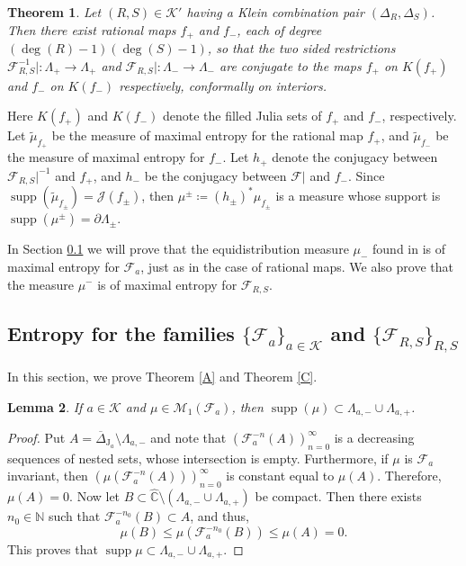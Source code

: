 \documentclass[11pt,letterpaper]{article}
\newtheorem{theorem}{Theorem}[section]
\newtheorem{lemma}[theorem]{Lemma}
\theoremstyle{definition}
\def\supp{\operatorname{supp}}
\def\F{\mathcal{F}_a}
\def\J{\operatorname{J}_a}
\begin{document}
\begin{theorem}\label{KleinRS}
Let $(R,S)\in\mathcal{K}'$ having a Klein combination pair $(\Delta_R,\Delta_S)$. Then there exist rational maps $f_+$ and $f_-$, each of degree $(\deg(R)-1)(\deg(S)-1)$, so that the two sided restrictions $\mathcal{F}_{R,S}^{-1}|:\Lambda_+\to\Lambda_+$ and $\mathcal{F}_{R,S}|:\Lambda_-\to\Lambda_-$ are conjugate to the maps $f_+$  on $K(f_+)$ and $f_-$ on $K(f_-)$ respectively, conformally on interiors.
\end{theorem}
Here $K(f_+)$ and $K(f_-)$ denote the filled Julia sets of $f_+$ and $f_-$, respectively. Let $\tilde{\mu}_{f_+}$ be the measure of maximal entropy for the rational map $f_+$, and $\tilde{\mu}_{f_-}$ be the measure of maximal entropy for $f_-$. Let $h_+$ denote the conjugacy between $\mathcal{F}_{R,S}|^{-1}$ and $f_+$, and $h_-$ be the conjugacy between $\mathcal{F}|$ and $f_-$. Since $\supp(\tilde{\mu}_{f_\pm})=\mathcal{J}(f_{\pm})$, then $\mu^{\pm}\coloneqq(h_\pm)^*\mu_{f_{\pm}}$ is a measure whose support is $\supp(\mu^{\pm})=\partial\Lambda_\pm$.

In Section \ref{examples} we will prove that the equidistribution measure $\mu_-$ found in \cite{Mat23} is of maximal entropy for $\F$, just as in the case of rational maps. We also prove that the measure $\mu^-$ is of maximal entropy for $\mathcal{F}_{R,S}$.
\label{ent}
\subsection{Entropy for the families $\lbrace\F\rbrace_{a\in\mathcal{K}}$ and $\lbrace\mathcal{F}_{R,S}\rbrace_{R,S}$}\label{examples}
In this section, we prove Theorem \ref{A} and Theorem \ref{C}.

\begin{lemma}\label{measuresupport}
If $a\in\mathcal{K}$ and $\mu\in\mathcal{M}_1(\F)$, then $\supp(\mu)\subset\Lambda_{a,-}\cup\Lambda_{a,+}$.
\end{lemma}

\begin{proof}

Put $A=\overline{\Delta}_{\J}\setminus\Lambda_{a,-}$ and note that $(\F^{-n}(A))_{n=0}^\infty$ is a decreasing sequences of nested sets, whose intersection is empty. Furthermore, if $\mu$ is $\F$ invariant, then $(\mu(\F^{-n}(A)))_{n=0}^\infty$ is constant equal to $\mu(A)$. Therefore, $\mu(A)=0$. Now let $B\subset\widehat{\mathbb{C}}\setminus(\Lambda_{a,-}\cup\Lambda_{a,+})$ be compact. Then there exists $n_0\in\mathbb{N}$ such that $\F^{-n_0}(B)\subset A$, and thus,
$$\mu(B)\leq\mu(\F^{-n_0}(B))\leq\mu(A)=0.$$
This proves that $\supp\mu\subset\Lambda_{a,-}\cup\Lambda_{a,+}$.
\end{proof}
\end{document}
